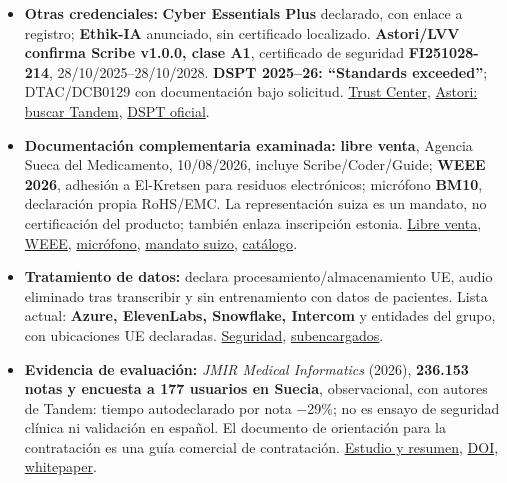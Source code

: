 \begin{itemize}
\item \textbf{Otras credenciales:} \textbf{Cyber Essentials Plus} declarado, con enlace a registro; \textbf{Ethik-IA} anunciado, sin certificado localizado. \textbf{Astori/\allowbreak{}LVV confirma Scribe v1.0.0, clase A1}, certificado de seguridad \textbf{FI251028-214}, 28/\allowbreak{}10/\allowbreak{}2025–28/\allowbreak{}10/\allowbreak{}2028. \textbf{DSPT 2025–26: “Standards exceeded”}; DTAC/\allowbreak{}DCB0129 con documentación bajo solicitud. \href{https://trust.tandemhealth.ai/}{Trust Center}, \href{https://astori.lvv.fi/}{Astori: buscar Tandem}, \href{https://www.dsptoolkit.nhs.uk/OrganisationSearch/TAHEAB001}{DSPT oficial}.
\item \textbf{Documentación complementaria examinada:} \textbf{libre venta}, Agencia Sueca del Medicamento, 10/\allowbreak{}08/\allowbreak{}2026, incluye Scribe/\allowbreak{}Coder/\allowbreak{}Guide; \textbf{WEEE 2026}, adhesión a El-Kretsen para residuos electrónicos; micrófono \textbf{BM10}, declaración propia RoHS/\allowbreak{}EMC. La representación suiza es un mandato, no certificación del producto; también enlaza inscripción estonia. \href{https://trust.tandemhealth.ai/doc/trust?rid=6a86ba9438622132aac7533c\&r=e0qkrepqo674el4jxq28px\&view=true}{Libre venta}, \href{https://trust.tandemhealth.ai/doc/trust?rid=6a78f060820290d89042a93e\&r=e0qkrepqo674el4jxq28px\&view=true}{WEEE}, \href{https://trust.tandemhealth.ai/doc/trust?rid=6a78f0c64c2eeb0a116d6fb1\&r=e0qkrepqo674el4jxq28px\&view=true}{micrófono}, \href{https://www.chrep.me/certificates-ch-rep/ch-rep-eu6romde4}{mandato suizo}, \href{https://trust.tandemhealth.ai/resources}{catálogo}.
\item \textbf{Tratamiento de datos:} declara procesamiento/\allowbreak{}almacenamiento UE, audio eliminado tras transcribir y sin entrenamiento con datos de pacientes. Lista actual: \textbf{Azure, ElevenLabs, Snowflake, Intercom} y entidades del grupo, con ubicaciones UE declaradas. \href{https://tandemhealth.ai/product/data-security}{Seguridad}, \href{https://trust.tandemhealth.ai/subprocessors}{subencargados}.
\item \textbf{Evidencia de evaluación:} \emph{JMIR Medical Informatics} (2026), \textbf{236.153 notas y encuesta a 177 usuarios en Suecia}, observacional, con autores de Tandem: tiempo autodeclarado por nota \ensuremath{-}29\%; no es ensayo de seguridad clínica ni validación en español. El documento de orientación para la contratación es una guía comercial de contratación. \href{https://tandemhealth.ai/resources/research/evaluation-of-an-ai-medical-scribe-after-236153-notes-generated-across-care-levels-in-a-european-health-system}{Estudio y resumen}, \href{https://doi.org/10.2196/90052}{DOI}, \href{https://mcusercontent.com/92915049aef2f51e4bcdd8434/files/a252c926-b88a-0af8-4071-a19fed8b9bf5/Procurement\_of\_Ambient\_Voice\_Technology\_EN.pdf}{whitepaper}.
\end{itemize}

